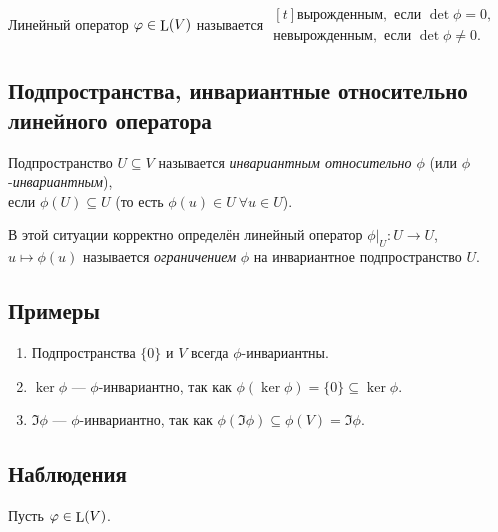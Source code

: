 \begin{definition}
    Линейный оператор $\varphi \in \operatorname{\mathop{\mathrm{L}}}(V)$ называется 
    \begin{math}
        \begin{gathered}[t]
            \textit{вырожденным}, \text{ если } \det \phi = 0, \\
            \textit{невырожденным}, \text{ если } \det \phi \neq 0.    
        \end{gathered}
    \end{math}
\end{definition}


\subsection{Подпространства, инвариантные относительно линейного оператора}

\begin{definition}
    Подпространство $U \subseteq V$ называется \textit{инвариантным относительно $\phi$} (или $\phi$-\textit{инвариантным}), \\если $\phi(U) \subseteq U$ (то есть $\phi(u) \in U \ \forall u \in U$).    
\end{definition}

В этой ситуации корректно определён линейный оператор $\phi\Big|_U \colon U \to U$, $u \mapsto \phi(u)$ называется \textit{ограничением} $\phi$ на инвариантное подпространство $U$.


\subsection{Примеры}

\begin{enumerate}
\item Подпространства $\{0\}$ и $V$ всегда $\phi$-инвариантны.
\item $\ker \phi$ --- $\phi$-инвариантно, так как $\phi(\ker \phi) = \{0\} \subseteq \ker \phi$.
\item $\Im \phi$ --- $\phi$-инвариантно, так как $\phi(\Im \phi) \subseteq \phi(V) = \Im \phi$.
\end{enumerate}



\subsection{Наблюдения}

Пусть $\varphi \in \operatorname{\mathop{\mathrm{L}}}(V)$.

